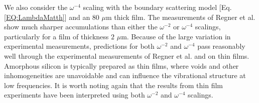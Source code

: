 \documentclass[aps,prb,onecolumn,preprint,superscriptaddress,footinbib,amsmath,amssymb,floatfix]{revtex4}
\begin{document}
We also consider the $\omega^{-4}$ scaling with the boundary 
scattering model [Eq. \eqref{EQ:LambdaMatth}] and an 80 $\mu$m 
thick film. 
The measurements of Regner et al. show much sharper accumulations 
than either the $\omega^{-2}$ or $\omega^{-4}$ scalings, 
particularly for a film of thickness $2$ $\mu$m. 
Because of the large variation in 
experimental measurements, predictions for both $\omega^{-2}$ 
and $\omega^{-4}$ pass reasonably well 
through the experimental measurements of Regner et al. and 
on thin films. 
Amorphous silicon is typically 
prepared as thin films,\cite{vacher_attenuation_1980} 
where voids and other inhomogeneities are unavoidable and can 
influence the vibrational structure at low frequencies.
\cite{feldman_tight-binding_2004,liu_high_2009,
yang_anomalously_2010,li_effect_2011,li_enhancement_2012} 
It is worth noting again 
that the results from thin film experiments have been interpreted 
using both $\omega^{-2}$ and $\omega^{-4}$ scalings.
\cite{feldman_thermal_1993,cahill_thermal_1994,
feldman_numerical_1999,liu_high_2009,yang_anomalously_2010} 

\end{document}
